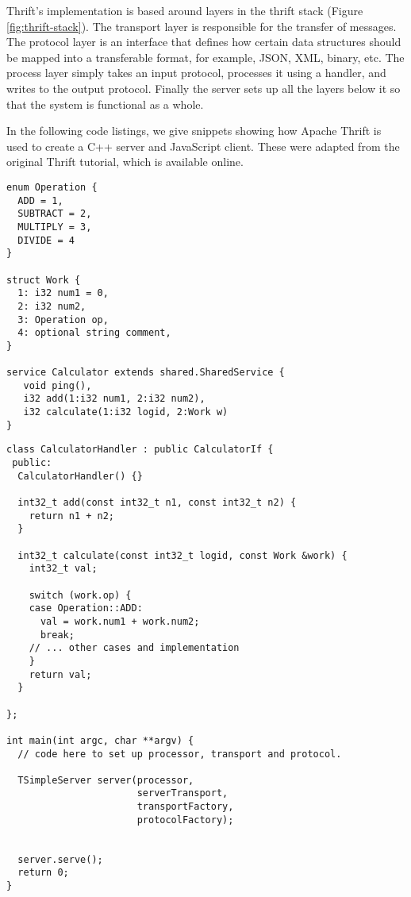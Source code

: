 Thrift's implementation is based around layers in the thrift stack (Figure \ref{fig:thrift-stack}). The transport layer is responsible for the transfer of messages. The protocol layer is an interface that defines how certain data structures should be mapped into a transferable format, for example, JSON, XML, binary, etc. The process layer simply takes an input protocol, processes it using a handler, and writes to the output protocol. Finally the server sets up all the layers below it so that the system is functional as a whole.

In the following code listings, we give snippets showing how Apache Thrift is used to create a C++ server and JavaScript client. These were adapted from the original Thrift tutorial, which is available online\cite{apachethrift}.

\begin{lstlisting}
enum Operation {
  ADD = 1,
  SUBTRACT = 2,
  MULTIPLY = 3,
  DIVIDE = 4
}

struct Work {
  1: i32 num1 = 0,
  2: i32 num2,
  3: Operation op,
  4: optional string comment,
}

service Calculator extends shared.SharedService {
   void ping(),
   i32 add(1:i32 num1, 2:i32 num2),
   i32 calculate(1:i32 logid, 2:Work w)
}
\end{lstlisting}

\begin{lstlisting}
class CalculatorHandler : public CalculatorIf {
 public:
  CalculatorHandler() {}

  int32_t add(const int32_t n1, const int32_t n2) {
    return n1 + n2;
  }

  int32_t calculate(const int32_t logid, const Work &work) {
    int32_t val;

    switch (work.op) {
    case Operation::ADD:
      val = work.num1 + work.num2;
      break;
    // ... other cases and implementation
    }
    return val;
  }

};

int main(int argc, char **argv) {
  // code here to set up processor, transport and protocol.

  TSimpleServer server(processor,
                       serverTransport,
                       transportFactory,
                       protocolFactory);


  server.serve();
  return 0;
}
\end{lstlisting}


